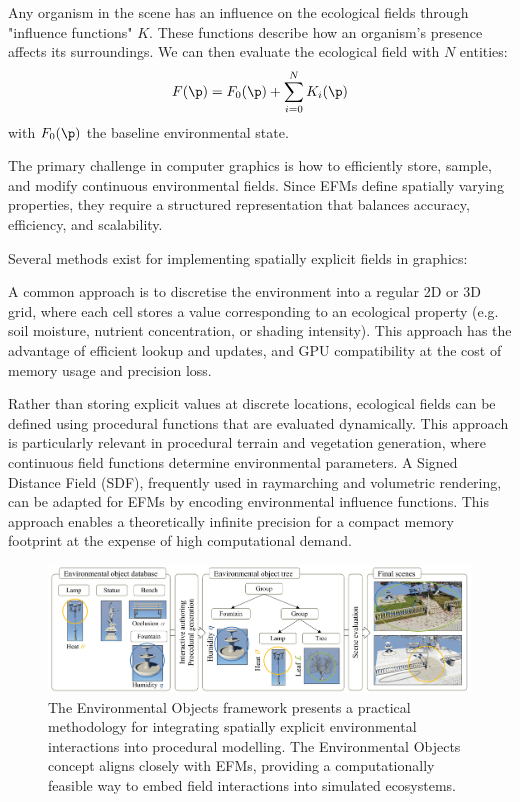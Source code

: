 Any organism in the scene has an influence on the ecological fields through "influence functions" $K$. These functions describe how an organism's presence affects its surroundings. We can then evaluate the ecological field with $N$ entities:
\begin{align}
\label{eq:env-obj-eco-field-computation}
F(\p) = F_0(\p) + \sum_{i=0}^{N}{K_i(\p)}
\end{align}
with $F_0(\p)$ the baseline environmental state.

The primary challenge in computer graphics is how to efficiently store, sample, and modify continuous environmental fields. Since EFMs define spatially varying properties, they require a structured representation that balances accuracy, efficiency, and scalability.

Several methods exist for implementing spatially explicit fields in graphics:
\begin{Itemize}
    \Item{} A common approach is to discretise the environment into a regular 2D or 3D grid, where each cell stores a value corresponding to an ecological property (e.g. soil moisture, nutrient concentration, or shading intensity). This approach has the advantage of efficient lookup and updates, and GPU compatibility at the cost of memory usage and precision loss.

    \Item{} Rather than storing explicit values at discrete locations, ecological fields can be defined using procedural functions that are evaluated dynamically. This approach is particularly relevant in procedural terrain and vegetation generation, where continuous field functions determine environmental parameters. A Signed Distance Field (SDF), frequently used in raymarching and volumetric rendering, can be adapted for EFMs by encoding environmental influence functions. This approach enables a theoretically infinite precision for a compact memory footprint at the expense of high computational demand.
\end{Itemize}


\begin{figure}[H]
\centering
\includegraphics[]{env-objs-Grosbellet2016.png}
\caption{The Environmental Objects framework \cite{Grosbellet2016} presents a practical methodology for integrating spatially explicit environmental interactions into procedural modelling. The Environmental Objects concept aligns closely with EFMs, providing a computationally feasible way to embed field interactions into simulated ecosystems.}
\label{fig:env-obj-teaser-grosbellet2016}
\end{figure}

